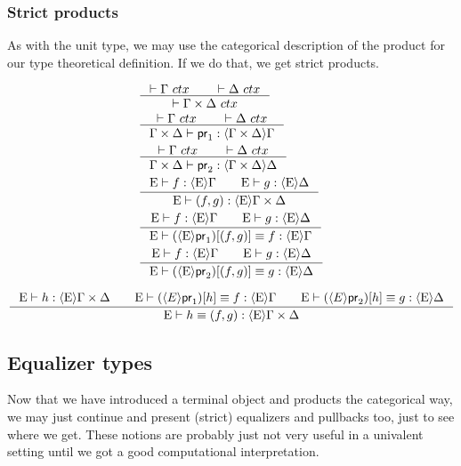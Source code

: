 \subsubsection{Strict products}
As with the unit type, we may use the categorical description of the product
for our type theoretical definition. If we do that, we get strict products.

\begin{align}
& \inference{\jctx{\Gamma}\qquad\jctx{\Delta}}{\jctx{\product{\Gamma}{\Delta}}}\\
& \inference{\jctx{\Gamma}\qquad\jctx{\Delta}}{\jhom{\product{\Gamma}{\Delta}}{\Gamma}{\proj1}}\\
& \inference{\jctx{\Gamma}\qquad\jctx{\Delta}}{\jhom{\product{\Gamma}{\Delta}}{\Delta}{\proj2}}\\
& \inference{\jhom{\greek{E}}{\Gamma}{f}\qquad\jhom{\greek{E}}{\Delta}{g}}
          {\jhom{\greek{E}}{\product{\Gamma}{\Delta}}{\pairp{f,g}}}\\
& \inference{\jhom{\greek{E}}{\Gamma}{f}\qquad\jhom{\greek{E}}{\Delta}{g}}
          {\jhomeq{\greek{E}}{\Gamma}{\jcomp{\greek{E}}{\pairp{f,g}}{\proj1}}{f}}\\
& \inference{\jhom{\greek{E}}{\Gamma}{f}\qquad\jhom{\greek{E}}{\Delta}{g}}
          {\jhomeq{\greek{E}}{\Delta}{\jcomp{\greek{E}}{\pairp{f,g}}{\proj2}}{g}}
\end{align}

\begin{equation}
\inference{\jhom{\greek{E}}{\product{\Gamma}{\Delta}}{h}
           \qquad
           \jhomeq{\greek{E}}{\Gamma}{\jcomp{E}{h}{\proj1}}{f}
           \qquad
           \jhomeq{\greek{E}}{\Delta}{\jcomp{E}{h}{\proj2}}{g}}
          {\jhomeq{\greek{E}}{\product{\Gamma}{\Delta}}{h}{\pairp{f,g}}}
\end{equation}

\subsection{Equalizer types}
Now that we have introduced a terminal object and products the categorical way,
we may just continue and present (strict) equalizers and pullbacks too, just to
see where we get. These notions are probably just not very useful in a univalent
setting until we got a good computational interpretation.

